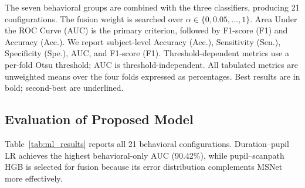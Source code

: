 \documentclass[conference,a4paper]{IEEEtran}
\begin{document}
The seven behavioral groups are combined with the three classifiers, producing 21 configurations. The fusion weight is searched over $\alpha\in\{0,0.05,\ldots,1\}$. Area Under the ROC Curve (AUC) is the primary criterion, followed by F1-score (F1) and Accuracy (Acc.). We report subject-level Accuracy (Acc.), Sensitivity (Sen.), Specificity (Spe.), AUC, and F1-score (F1). Threshold-dependent metrics use a per-fold Otsu threshold; AUC is threshold-independent. All tabulated metrics are unweighted means over the four folds expressed as percentages. Best results are in bold; second-best are underlined.

\subsection{Evaluation of Proposed Model}
Table~\ref{tab:ml_results} reports all 21 behavioral configurations. Duration--pupil LR achieves the highest behavioral-only AUC (90.42\%), while pupil--scanpath HGB is selected for fusion because its error distribution complements MSNet more effectively.
\end{document}
